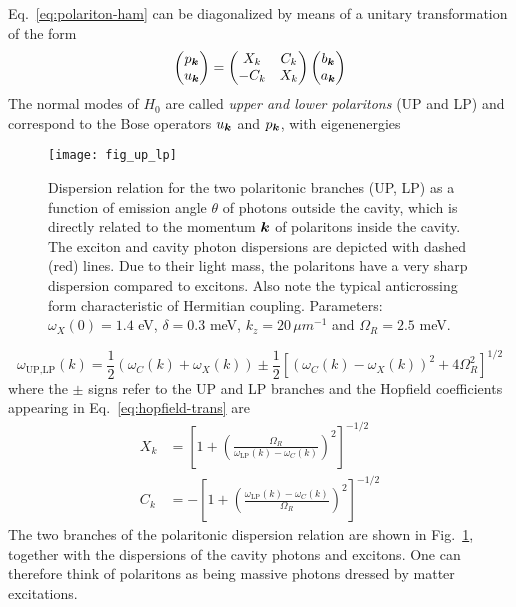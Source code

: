 Eq.~\eqref{eq:polariton-ham} can be diagonalized by means of a unitary
transformation of the form~\cite{Hopfield1958}
%
\begin{equation}\label{eq:hopfield-trans}
  \begin{pmatrix} p_{\bm{k}}\\ u_{\bm{k}} \end{pmatrix} = \begin{pmatrix} X_k & C_k\\ -C_k & X_k \end{pmatrix} \begin{pmatrix} b_{\bm{k}}\\ a_{\bm{k}} \end{pmatrix}
\end{equation}
% 
The normal modes of $H_0$ are called \textit{upper and lower
  polaritons} (UP and LP) and correspond to the Bose operators
$u_{\bm{k}}$ and $p_{\bm{k}}$, with eigenenergies
%
\begin{figure}[tb]\centering
  \texttt{[image: fig\_up\_lp]}
  \caption{
    Dispersion relation for the two polaritonic branches (UP, LP) as a
    function of emission angle $\theta$ of photons outside the cavity,
    which is directly related to the momentum $\bm{k}$ of polaritons inside
    the cavity. The exciton and cavity photon dispersions are depicted
    with dashed (red) lines. Due to their light mass, the polaritons have
    a very sharp dispersion compared to excitons. Also note the typical
    anticrossing form characteristic of Hermitian coupling. Parameters:
    $\omega_X(0) = 1.4$ eV, $\delta = 0.3$ meV, $k_z = 20\, \mu m^{-1}$
    and $\Omega_R = 2.5$ meV.
  }\label{fig:polariton-dispersion}
\end{figure}
% 
\begin{equation}\label{eq:polariton-dispersion}
  \omega_{\text{UP,LP}}(k) = \frac{1}{2}\left(\omega_C(k) + \omega_X(k)\right) \pm \frac{1}{2}\left[\left(\omega_C(k) - \omega_X(k)\right)^2 + 4 \Omega_R^2\right]^{1/2}
\end{equation}
% 
where the $\pm$ signs refer to the UP and LP branches and the Hopfield
coefficients appearing in Eq.~\eqref{eq:hopfield-trans} are
\begin{align}
  X_k & =\left[1 + \left(\frac{\Omega_R}{\omega_{\text{LP}}(k) - \omega_C(k)}\right)^2\right]^{-1/2}\label{eq:hopfield-X}\\
  C_k & =-\left[1 + \left(\frac{\omega_{\text{LP}}(k) -
        \omega_C(k)}{\Omega_R}\right)^2\right]^{-1/2}\label{eq:hopfield-C}
\end{align}
The two branches of the polaritonic dispersion relation are shown in
Fig.~\ref{fig:polariton-dispersion}, together with the dispersions of
the cavity photons and excitons. One can therefore think of polaritons
as being massive photons dressed by matter excitations.

